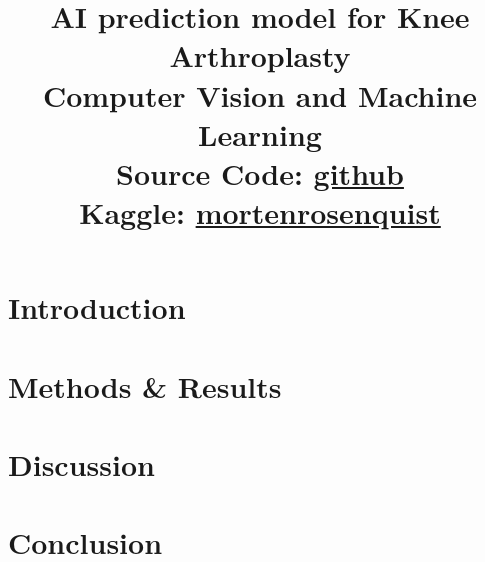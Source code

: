 \documentclass[conference]{IEEEtran}
\begin{document}
\title{AI prediction model for Knee Arthroplasty\\
{\LARGE Computer Vision and Machine Learning}\\
{\large Source Code: \href{https://github.com/mlRosenquist/au-mlr-computer-vision-and-ml/tree/master/project}{github}}\\
{\large Kaggle: \href{https://www.kaggle.com/mortenrosenquist} {mortenrosenquist}}
}

\author{
}

\maketitle

\begin{abstract}
\end{abstract}

\begin{IEEEkeywords}
\end{IEEEkeywords}

\section{Introduction}


\section{Methods \& Results}


\section{Discussion}


\section{Conclusion}


\end{document}
